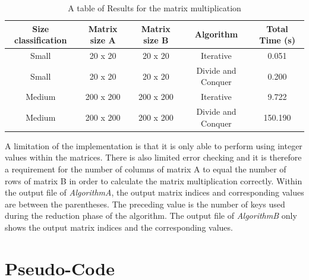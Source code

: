 \documentclass[conference]{IEEEtran}
\begin{document}
\begin{table}[H]
\centering
\caption{A table of Results for the matrix multiplication} 
\begin{tabular}{|c|c|c|c|c|}
\hline
Size classification             &Matrix size A      & Matrix size B         & Algorithm                 & Total Time (s)\\
\hline
Small                           &20 x 20            &20 x 20                &Iterative                  &0.051\\
\hline
Small                           &20 x 20            &20 x 20                &Divide and Conquer         &0.200\\  
\hline
Medium                          &200 x 200          &200 x 200              &Iterative                  &9.722\\
\hline
Medium                          &200 x 200          &200 x 200              &Divide and Conquer         &150.190\\
\hline
\end{tabular}

\end{table} 

\noindent  A limitation of the implementation is that it is only able to perform using integer values within the matrices. There is also limited error checking and it is therefore a requirement for the number of columns of matrix A to equal the number of rows of matrix B in order to calculate the matrix multiplication correctly. Within the output file of \textit{AlgorithmA}, the output matrix indices and corresponding values are between the parentheses. The preceding value is the number of keys used during the reduction phase of the algorithm. The output file of \textit{AlgorithmB} only shows the output matrix indices and the corresponding values.

\newpage
\section{Pseudo-Code}
\end{document}
